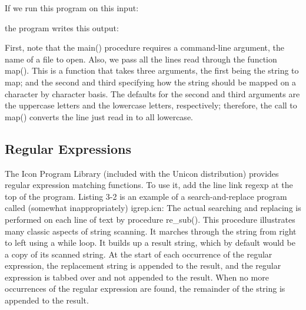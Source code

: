 \noindent If we run this program on this input: 


\noindent the program writes this output: 


First, note that the \textsf{main()} procedure requires a command-line
argument, the name of a file to open. Also, we pass all the lines read
through the function \textsf{map()}. This is a function that takes
three arguments, the first being the string to map; and the second and
third specifying how the string should be mapped on a character by
character basis. The defaults for the second and third arguments are
the uppercase letters and the lowercase letters, respectively;
therefore, the call to \textsf{map()} converts the line just read in to
all lowercase.

\subsection{Regular Expressions}

The Icon Program Library (included with the Unicon distribution)
provides regular expression matching
functions. To use it, add the line \textsf{link regexp} at the top of
the program. Listing 3-2 is an example of a search-and-replace program
called (somewhat inappropriately)
\textsf{i}\textsf{grep}\textsf{.icn}: The actual searching
and replacing is performed on each line of text by procedure
\textsf{re\_sub()}. This procedure illustrates many classic aspects of
string scanning. It marches through the string from right to left using
a while loop. It builds up a result string, which by default would be a
copy of its scanned string. At the start of each occurrence of the
regular expression, the replacement string is appended to the result,
and the regular expression is tabbed over and not appended to the
result. When no more occurrences of the regular expression are found,
the remainder of the string is appended to the result.

